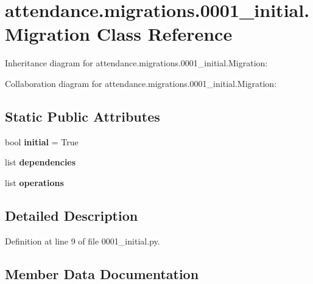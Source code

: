 \hypertarget{classattendance_1_1migrations_1_10001__initial_1_1_migration}{}\section{attendance.\+migrations.0001\+\_\+initial.Migration Class Reference}
\label{classattendance_1_1migrations_1_10001__initial_1_1_migration}


Inheritance diagram for attendance.\+migrations.0001\+\_\+initial.Migration\+:


Collaboration diagram for attendance.\+migrations.0001\+\_\+initial.Migration\+:
\subsection*{Static Public Attributes}
\begin{DoxyCompactItemize}
\item 
\hypertarget{classattendance_1_1migrations_1_10001__initial_1_1_migration_a9f2fc5eaba56411a7d8c2b7b99d13531}{}\label{classattendance_1_1migrations_1_10001__initial_1_1_migration_a9f2fc5eaba56411a7d8c2b7b99d13531} 
bool {\bfseries initial} = True
\item 
list {\bfseries dependencies}
\item 
\hypertarget{classattendance_1_1migrations_1_10001__initial_1_1_migration_a78b3d3616c8f223a5a91e987138927f4}{}\label{classattendance_1_1migrations_1_10001__initial_1_1_migration_a78b3d3616c8f223a5a91e987138927f4} 
list {\bfseries operations}
\end{DoxyCompactItemize}


\subsection{Detailed Description}


Definition at line 9 of file 0001\+\_\+initial.\+py.



\subsection{Member Data Documentation}
\hypertarget{classattendance_1_1migrations_1_10001__initial_1_1_migration_a50da3cd4c840aa76fa1b4a8d36f1014b}{}\label{classattendance_1_1migrations_1_10001__initial_1_1_migration_a50da3cd4c840aa76fa1b4a8d36f1014b} 
